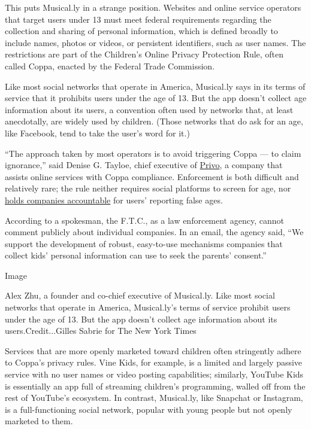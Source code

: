 This puts Musical.ly in a strange position. Websites and online service
operators that target users under 13 must meet federal requirements
regarding the collection and sharing of personal information, which is
defined broadly to include names, photos or videos, or persistent
identifiers, such as user names. The restrictions are part of the
Children's Online Privacy Protection Rule, often called Coppa, enacted
by the Federal Trade Commission.

Like most social networks that operate in America, Musical.ly says in
its terms of service that it prohibits users under the age of 13. But
the app doesn't collect age information about its users, a convention
often used by networks that, at least anecdotally, are widely used by
children. (Those networks that do ask for an age, like Facebook, tend to
take the user's word for it.)

``The approach taken by most operators is to avoid triggering Coppa ---
to claim ignorance,'' said Denise G. Tayloe, chief executive of
\href{https://privo.com/}{Privo}, a company that assists online services
with Coppa compliance. Enforcement is both difficult and relatively
rare; the rule neither requires social platforms to screen for age, nor
\href{https://www.ftc.gov/tips-advice/business-center/guidance/complying-coppa-frequently-asked-questions}{holds
companies accountable} for users' reporting false ages.

According to a spokesman, the F.T.C., as a law enforcement agency,
cannot comment publicly about individual companies. In an email, the
agency said, ``We support the development of robust, easy-to-use
mechanisms companies that collect kids' personal information can use to
seek the parents' consent.''

Image

Alex Zhu, a founder and co-chief executive of Musical.ly. Like most
social networks that operate in America, Musical.ly's terms of service
prohibit users under the age of 13. But the app doesn't collect age
information about its users.Credit...Gilles Sabrie for The New York
Times

Services that are more openly marketed toward children often stringently
adhere to Coppa's privacy rules. Vine Kids, for example, is a limited
and largely passive service with no user names or video posting
capabilities; similarly, YouTube Kids is essentially an app full of
streaming children's programming, walled off from the rest of YouTube's
ecosystem. In contrast, Musical.ly, like Snapchat or Instagram, is a
full-functioning social network, popular with young people but not
openly marketed to them.

